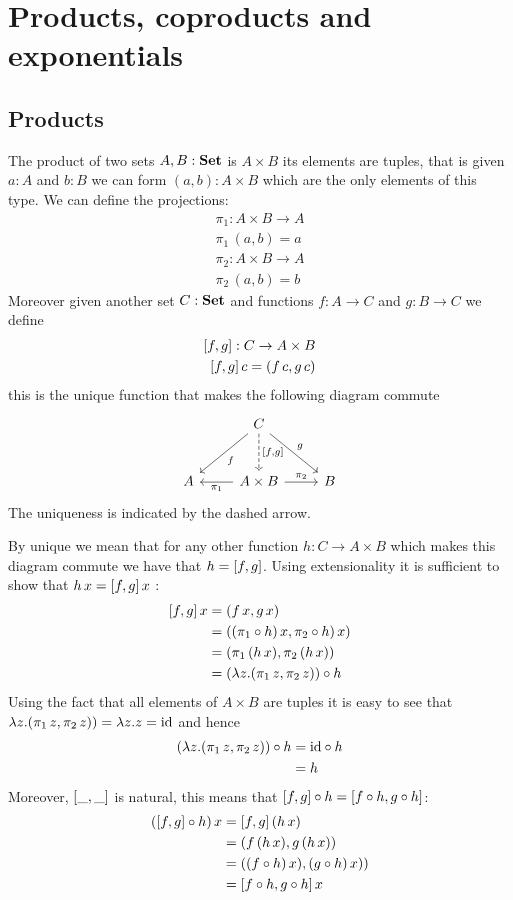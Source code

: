 \chapter{Products, coproducts and exponentials}
\label{sec:prod-copr-expon}

\section{Products}
\label{sec:products}

The product of two sets $A,B : \mathbf{Set}$ is $A\times B$ its elements are tuples, that is given $a:A$ and $b:B$ we can form $(a,b) : A \times B$ which are the only elements of this type. We can define the projections:
\begin{align*}
\pi_1 : A \times B \to A \\
\pi_1\,(a,b) = a \\
\pi_2 : A \times B \to A \\
\pi_2\,(a,b) = b
\end{align*}
Moreover given another set $C:\mathbf{Set}$ and functions $f : A \to C$ and $g : B \to C$ we define
\begin{align*}
\pair{f}{g} : C \to A \times B \\
\pair{f}{g}\,c = (f\,c,g\,c)
\end{align*}
this is the unique function that makes the following diagram commute 
\[\begin{tikzcd}[row sep = large]
& C \arrow[dl,"f"] \arrow[d, dashrightarrow,"\pair{f}{g}"] \arrow[dr,"g"]\\
A & A \times B \arrow[r,"\pi_2"] \arrow[l,"\pi_1"]& B
\end{tikzcd}\]
The uniqueness is indicated by the dashed arrow. 

By unique we mean that for any other function $h : C \to A \times B$ which makes this diagram commute we have that $h = [f,g]$. Using extensionality it is sufficient to show that $h\,x = [f,g]\,x$ :
\begin{align*}
[f,g]\,x
& = (f\,x,g\,x) \\
& = ((\pi_1 \circ h)\,x, \pi_2 \circ h)\,x)\\
& = (\pi_1 \,( h\,x), \pi_2\,(h\,x))\\
& = (\lambda z.(\pi_1\,z,\pi_2\,z))\circ h\\
\end{align*}
Using the fact that all elements of $A \times B$ are tuples it is easy to see that $\lambda z.(\pi_1\,z,\pi_2\,z)) = \lambda z.z = \mathrm{id}$ and hence
\begin{align*}
(\lambda z.(\pi_1\,z,\pi_2\,z))\circ h
& = \mathrm{id} \circ h \\
& = h
\end{align*}
Moreover, $[\_,\_]$ is natural, this means that $[f,g] \circ h = [f \circ h,g \circ h]$:
\begin{align*}
([f,g] \circ h)\,x
& = [f,g]\,(h\,x) \\
& = (f\,(h\,x),g\,(h\,x)) \\
& = ((f\circ h)\,x),(g\circ h)\,x)) \\
& = [f \circ h,g \circ h]\,x
\end{align*}

